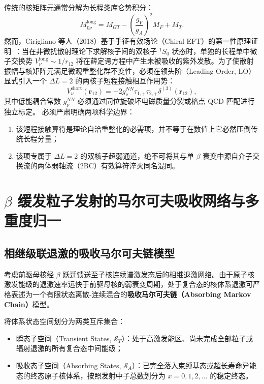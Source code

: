 传统的核矩阵元通常分解为长程类库仑势积分：
\begin{equation}\label{eq:appD-0nubb-long-range}
M_{0\nu}^{\mathrm{long}} = M_{GT} - \left(\frac{g_V}{g_A}\right)^2 M_F + M_T.
\end{equation}
然而，Cirigliano 等人（2018）基于手征有效场论（Chiral EFT）的第一性原理证明~\cite{cirigliano-2018-leading-short-range-double-beta}：当在非微扰散射理论下求解核子间的双核子 $^1S_0$ 状态时，单独的长程单中微子交换势 $V_\nu^{\mathrm{long}} \sim 1/r_{12}$ 将在薛定谔方程中产生未被吸收的紫外发散。为了使散射振幅与核矩阵元满足微观重整化群不变性，必须在领头阶（Leading Order, LO）显式引入一个 $\Delta L = 2$ 的两核子短程接触相互作用势：
\begin{equation}\label{eq:appD-contact-potential}
V_\nu^{\mathrm{short}}(\mathbf{r}_{12}) = -2 g_\nu^{NN} \tau_{1,+} \tau_{2,+} \delta^{(3)}(\mathbf{r}_{12}),
\end{equation}
其中低能耦合常数 $g_\nu^{NN}$ 必须通过同位旋破坏电磁质量分裂或格点 QCD 匹配进行独立标定。
必须严肃明确两项科学边界：
\begin{enumerate}
\item 该短程接触算符是理论自洽重整化的必需项，并不等于在数值上它必然压倒传统长程分量；
\item 该项专属于 $\Delta L = 2$ 的双核子超弱通道，绝不可将其与单 $\beta$ 衰变中源自介子交换流的两体弱轴流（2BC）有效算符淬灭同名混同。
\end{enumerate}

\section{$\beta$ 缓发粒子发射的马尔可夫吸收网络与多重度归一}\label{sec:appD-delayed-neutron-network}

\subsection{相继级联退激的吸收马尔可夫链模型}

考虑前驱母核经 $\beta$ 跃迁馈送至子核连续谱激发态后的相继退激网络。由于原子核激发能级的退激速率远快于前驱母核的弱衰变周期，处于复合态的核体系退激可严格表述为一个有限状态离散-连续混合的\textbf{吸收马尔可夫链（Absorbing Markov Chain）}模型。

将体系状态空间划分为两类互斥集合：
\begin{itemize}
\item 瞬态子空间（Transient States, $\mathcal{S}_T$）：处于高激发能区、尚未完成全部粒子或辐射退激的所有复合态中间能级；
\item 吸收态子空间（Absorbing States, $\mathcal{S}_A$）：已完全落入束缚基态或超长寿命异能态的终态原子核体系，按照发射中子总数划分为 $x = 0, 1, 2, \dots$ 的稳定终态。
\end{itemize}

